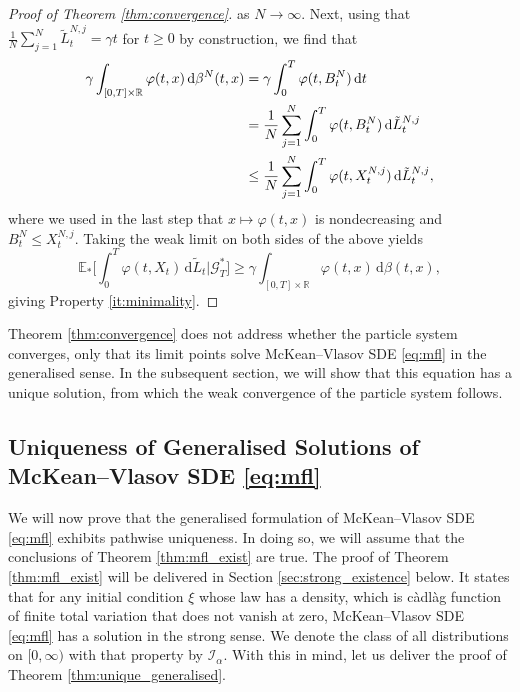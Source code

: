 \documentclass[11pt, a4paper]{article}
\theoremstyle{plain}
\theoremstyle{definition}
\theoremstyle{remark}
\numberwithin{equation}{section}
\newcommand{\ev}{\mathbb{E}}
\newcommand{\R}{\mathbb{R}}
\renewcommand{\d}{\mathrm{d}}
\renewcommand{\cal}[1]{\mathcal{#1}}
\begin{document}
\begin{proof}[Proof of Theorem \ref{thm:convergence}]
as $N \to \infty$. Next, using that $\frac{1}{N}\sum_{j = 1}^N \tilde{L}^{N, j}_t = \gamma t$ for $t \geq 0$ by construction, we find that
\begin{align} \label{eq:ineq_ps}
    \gamma \int_{[0, T] \times \R} \varphi(t, x) \, \d \beta^N(t,  x) &= \gamma \int_0^T \varphi(t, B^N_t) \, \d t \notag \\
    &= \frac{1}{N} \sum_{j = 1}^N \int_0^T \varphi(t, B^N_t) \, \d \tilde{L}^{N, j}_t \notag \\
    &\leq \frac{1}{N} \sum_{j = 1}^N \int_0^T \varphi(t, X^{N, j}_t) \, \d \tilde{L}^{N, j}_t,
\end{align}
where we used in the last step that $x \mapsto \varphi(t, x)$ is nondecreasing and $B^N_t \leq X^{N, j}_t$. Taking the weak limit on both sides of the above yields
\begin{equation*}
    \ev_{\ast}\biggl[\int_0^T \varphi(t, X_t) \, \d \tilde{L}_t\bigg\vert \cal{G}^{\ast}_T \biggr] \geq \gamma \int_{[0, T] \times \R} \varphi(t, x) \, \d \beta(t, x),
\end{equation*}
giving Property \ref{it:minimality}.
\end{proof}


Theorem \ref{thm:convergence} does not address whether the particle system converges, only that its limit points solve McKean--Vlasov SDE \eqref{eq:mfl} in the generalised sense. In the subsequent section, we will show that this equation has a unique solution, from which the weak convergence of the particle system follows.


\subsection{Uniqueness of Generalised Solutions of McKean--Vlasov SDE \texorpdfstring{\eqref{eq:mfl}}{(EQ)}}

We will now prove that the generalised formulation of McKean--Vlasov SDE \eqref{eq:mfl} exhibits pathwise uniqueness. In doing so, we will assume that the conclusions of Theorem \ref{thm:mfl_exist} are true. The proof of Theorem \ref{thm:mfl_exist} will be delivered in Section \ref{sec:strong_existence} below. It states that for any initial condition $\xi$ whose law has a density, which is c\`adl\`ag function of finite total variation that does not vanish at zero, McKean--Vlasov SDE \eqref{eq:mfl} has a solution in the strong sense. We denote the class of all distributions on $[0, \infty)$ with that property by $\cal{I}_{\alpha}$. With this in mind, let us deliver the proof of Theorem \ref{thm:unique_generalised}.
\end{document}
